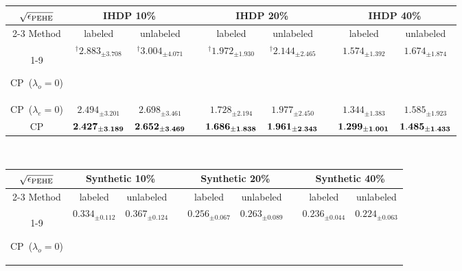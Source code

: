 \begin{table}[tbp]
\centering
\begin{tabular} {ccccccccc }
\toprule[2pt]
        $ \sqrt{\epsilon_{\rm PEHE}} $         & \multicolumn{2}{c}{ \bf{IHDP} 10\%}        &              & \multicolumn{2}{c}{\bf{IHDP} 20\%}& &  \multicolumn{2}{c}{\bf{IHDP} 40\%}      \\[3pt]\cmidrule{2-3}\cmidrule{5-6}\cmidrule{8-9}
Method                      & labeled  & unlabeled & \multicolumn{1}{l}{} & labeled & unlabeled & \multicolumn{1}{l}{} & labeled & unlabeled\\[3pt] \cmidrule{1-9}

CP~($\lambda_o=0$)  &  $^\dagger2.883_{\pm{3.708}}$ & $^\dagger3.004_{\pm{4.071}}$  & \multicolumn{1}{l}{} &  $^\dagger1.972_{\pm{1.930}}$  & $^\dagger2.144_{\pm{2.465}}$  &      &  $1.574_{\pm{1.392}}$  & $1.674_{\pm{1.874}}$      \\[3pt]

CP~($\lambda_e=0$) &        $2.494_{\pm{3.201}}$       &       $2.698_{\pm{3.461}}$         & \multicolumn{1}{l}{} &     $ 1.728_{\pm{2.194}}$   &   $1.977_{\pm{2.450}}$      &      &  $1.344_{\pm{1.383}}$  & $1.585_{\pm{1.923}}$        \\[3pt]

CP &       $\bf 2.427_{\pm{3.189}}$ & $\bf 2.652_{\pm{3.469}}$        & \multicolumn{1}{l}{} &     $\bf 1.686_{\pm{1.838}}$          & $\bf 1.961_{\pm{2.343}}$       &  &   $\bf 1.299_{\pm{1.001}} $& $\bf 1.485_{\pm{1.433}}$      \\[3pt]
\bottomrule[2pt]
    \end{tabular}
        \vspace{3mm} \\
    
\centering
\begin{tabular} {ccccccccc }
\toprule[2pt]
        $ \sqrt{\epsilon_{\rm PEHE}} $         & \multicolumn{2}{c}{ \bf{Synthetic} 10\%}        &              & \multicolumn{2}{c}{\bf{Synthetic} 20\%}& &  \multicolumn{2}{c}{\bf{Synthetic} 40\%}      \\[3pt]\cmidrule{2-3}\cmidrule{5-6}\cmidrule{8-9}
Method                      & labeled  & unlabeled & \multicolumn{1}{l}{} & labeled & unlabeled & \multicolumn{1}{l}{} & labeled & unlabeled\\[3pt] \cmidrule{1-9}

CP~($\lambda_o=0$)  &  $0.334_{\pm{0.112}}$ & $0.367_{\pm{0.124}}$  & \multicolumn{1}{l}{} &  $0.256_{\pm{0.067}}$  & $0.263_{\pm{0.089}}$  &      &  $0.236_{\pm{0.044}}$  & $0.224_{\pm{0.063}}$      \\[3pt]


\end{tabular}
\end{table}

